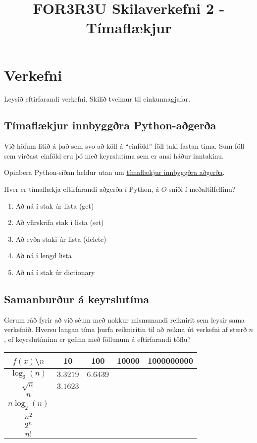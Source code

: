 \documentclass{article}
\title{FOR3R3U Skilaverkefni 2 - Tímaflækjur}
\begin{document}
\maketitle

\section{Verkefni}
Leysið eftirfarandi verkefni. Skilið tveimur til einkunnagjafar.

\subsection{Tímaflækjur innbyggðra Python-aðgerða}
Við höfum litið á það sem svo að köll á ``einföld'' föll taki fastan tíma. Sum föll sem virðast einföld eru þó með keyrslutíma sem er ansi háður inntakinu.

Opinbera Python-síðan heldur utan um \href{https://wiki.python.org/moin/TimeComplexity}{tímaflækjur innbyggðra aðgerða}.

Hver er tímaflækja eftirfarandi aðgerða í Python, á $O$-sniði í meðaltilfellinu?

\begin{enumerate}
 \item Að ná í stak úr lista (get)
 \item Að yfirskrifa stak í lista (set)
 \item Að eyða staki úr lista (delete)
 \item Að ná í lengd lista
 \item Að ná í stak úr dictionary
\end{enumerate}

\subsection{Samanburður á keyrslutíma}
Gerum ráð fyrir að við séum með nokkur mismunandi reiknirit sem leysir sama verkefnið. Hversu langan tíma þurfa reikniritin til að reikna út verkefni af stærð $n$, ef keyrslutíminn er gefinn með föllunum á eftirfarandi töflu?

\begin{center}
\begin{tabular}{ccccc}
\toprule
$f(x)$\textbackslash$n$&10&100&10000&1000000000\\
\midrule
$\log_2(n)$&$3.3219$&$6.6439$&&\\
$\sqrt{n}$&$3.1623$&&&\\
$n$&&&&\\
$n\log_2(n)$&&&&\\
$n^2$&&&&\\
$2^n$&&&&\\
$n!$&&&&\\
\bottomrule
\end{tabular}
\end{center}
\end{document}
